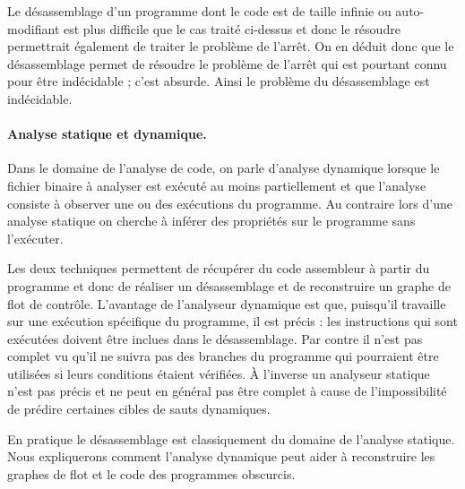 Le désassemblage d'un programme dont le code est de taille infinie ou auto-modifiant est plus difficile que le cas traité ci-dessus et donc le résoudre permettrait également de traiter le problème de l'arrêt.
On en déduit donc que le désassemblage permet de résoudre le problème de l'arrêt qui est pourtant connu pour être indécidable ; c'est absurde.
Ainsi le problème du désassemblage est indécidable.


\paragraph{Analyse statique et dynamique.}
Dans le domaine de l'analyse de code, on parle d'analyse dynamique lorsque le fichier binaire à analyser est exécuté au moins partiellement et que l'analyse consiste à observer une ou des exécutions du programme. Au contraire lors d'une analyse statique on cherche à inférer des propriétés sur le programme sans l'exécuter.

Les deux techniques permettent de récupérer du code assembleur à partir du programme et donc de réaliser un désassemblage et de reconstruire un graphe de flot de contrôle.
L'avantage de l'analyseur dynamique est que, puisqu'il travaille sur une exécution spécifique du programme, il est précis : les instructions qui sont exécutées doivent être inclues dans le désassemblage.
Par contre il n'est pas complet vu qu'il ne suivra pas des branches du programme qui pourraient être utilisées si leurs conditions étaient vérifiées. À l'inverse un analyseur statique n'est pas précis et ne peut en général pas être complet à cause de l'impossibilité de prédire certaines cibles de sauts dynamiques.

En pratique le désassemblage est classiquement du domaine de l'analyse statique. Nous expliquerons comment l'analyse dynamique peut aider à reconstruire les graphes de flot et le code des programmes obscurcis.

